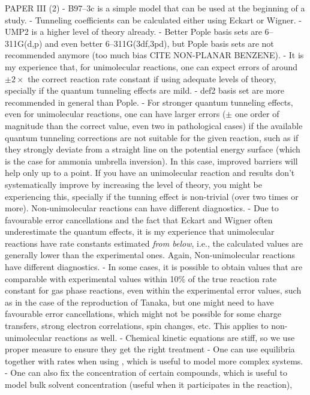 PAPER III (2)
- B97--3c is a simple model that can be used at the beginning of a study.
- Tunneling coefficients can be calculated either using Eckart or Wigner.
- UMP2 is a higher level of theory already.
- Better Pople basis sets are 6--311G(d,p) and even better 6--311G(3df,3pd),
but Pople basis sets are not recommended anymore (too much bias CITE NON-PLANAR BENZENE).
- It is my experience that,
for unimolecular reactions,
one can expect errors of around
$\pm 2 \times$ the correct reaction rate constant if using adequate levels of theory,
specially if
the quantum tunneling effects are mild.
- def2 basis set are more recommended in general than Pople.
- For stronger quantum tunneling effects,
even for unimolecular reactions,
one can have larger errors
($\pm$ one order of magnitude than the correct value,
even two in pathological cases) if the available quantum tunneling corrections are not suitable
for the given reaction,
such as if they strongly deviate from a straight line on the potential energy surface
(which is the case for ammonia umbrella inversion).
In this case,
improved barriers will help only up to a point.
If you have an unimolecular reaction
and results don't systematically improve by increasing the level of theory,
you might be experiencing this,
specially if the tunning effect is non-trivial (over two times or more).
Non-unimolecular reactions can have different diagnostics.
- Due to favourable error cancellations and the fact that
Eckart and Wigner often underestimate the quantum effects,
it is my experience that unimolecular reactions
have rate constants estimated \emph{from below},
i.e.,
the calculated values are generally lower than the
experimental ones.
Again,
Non-unimolecular reactions have different diagnostics.
- In some cases,
it is possible to obtain
values that are comparable with experimental values within 10\% of
the true reaction rate constant for gas phase reactions,
even within the experimental error values,
such as in the case
of the reproduction of Tanaka,
but one might need to have favourable error cancellations,
which might not be possible for some charge transfers,
strong electron correlations,
spin changes,
etc.
This applies to non-unimolecular reactions as well.
- Chemical kinetic equations are stiff,
so we use proper measure to ensure they get the right treatment
- One can use equilibria together with rates when using \overreact{},
which is useful to model more complex systems.
- One can also fix the concentration of certain compounds,
which is useful
to model bulk solvent concentration (useful when it participates in the reaction),
